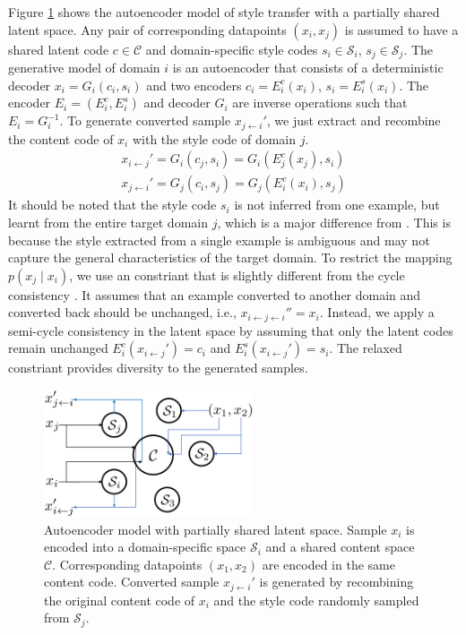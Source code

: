 \documentclass{article}
\begin{document}
Figure \ref{fig:model} shows the autoencoder model of style transfer with a partially shared latent space. Any pair of corresponding datapoints $(x_i, x_j)$ is assumed to have a shared latent code $c\in \mathcal{C}$ and domain-specific style codes $s_i\in \mathcal{S}_i$, $s_j\in \mathcal{S}_j$. The generative model of domain $i$ is an autoencoder that consists of a deterministic decoder $x_i = G_i(c_i,s_i)$ and two encoders $c_i = E_i^c(x_i)$, $s_i = E_i^s(x_i)$. The encoder $E_i = (E_i^c, E_i^s)$ and decoder $G_i$ are inverse operations such that $E_i = G_i^{-1}$. To generate converted sample $x_{j\leftarrow i}'$, we just extract and recombine the content code of $x_i$ with the style code of domain $j$.
\begin{equation}
\begin{aligned}
x_{i\leftarrow j}' = G_i(c_j, s_i) = G_i(E_j^c(x_j), s_i) \\
x_{j\leftarrow i}' = G_j(c_i, s_j) = G_j(E_i^c(x_i), s_j)
\end{aligned}
\end{equation}
It should be noted that the style code $s_i$ is not inferred from one example, but learnt from the entire target domain $j$, which is a major difference from \cite{DBLP:journals/corr/GatysEB15a}. This is because the style extracted from a single example is ambiguous and may not capture the general characteristics of the target domain. To restrict the mapping $p(x_j\mid x_i)$, we use an constriant that is slightly different from the cycle consistency \cite{Zhu_2017_ICCV}. It assumes that an example converted to another domain and converted back should be unchanged, i.e., $x_{i\leftarrow j\leftarrow i}'' = x_i$. Instead, we apply a semi-cycle consistency in the latent space by assuming that only the latent codes remain unchanged $E_i^c(x_{i\leftarrow j}') = c_i$ and $E_i^s(x_{i\leftarrow j}') = s_i$. The relaxed constriant provides diversity to the generated samples.

\begin{figure}[htb]
\center
\includegraphics[width=0.55\textwidth]{FIG/model}
\caption{Autoencoder model with partially shared latent space. Sample $x_i$ is encoded into a domain-specific space $\mathcal{S}_i$ and a shared content space $\mathcal{C}$. Corresponding datapoints $(x_1,x_2)$ are encoded in the same content code. Converted sample $x_{j\leftarrow i}'$ is generated by recombining the original content code of $x_i$ and the style code randomly sampled from $\mathcal{S}_j$.}
\label{fig:model}
\end{figure}
\end{document}
